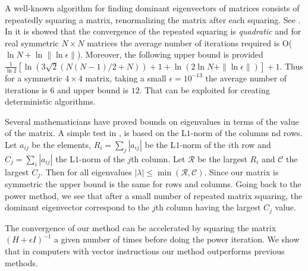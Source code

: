 \documentclass{birkjour}
\numberwithin{equation}{section}
\begin{document}
A well-known algorithm for finding dominant eigenvectors of matrices consists of repeatedly squaring a matrix, renormalizing the matrix after each squaring. See \cite{Wilkinson1988}. In \cite{Kostlan1991} it is showed that the convergence of the repeated squaring is \emph{quadratic} and for real symmetric $N \times N$ matrices the average number of iterations required is O($\ln N + \ln \|\ln \epsilon\|$). Moreover, the following upper bound is provided $\frac{1}{\ln 2} [ \ln( 3 \sqrt{2} ( N ( N - 1 ) / 2 + N ) ) + 1 + \ln( 2 \ln N + \|\ln \epsilon\|) ] + 1$. Thus for a symmetric $4 \times 4$ matrix, taking a small $\epsilon = 10^{-13}$ the average number of iterations is $6$ and upper bound is $12$. That can be exploited for creating deterministic algorithms.

Several mathematicians have proved bounds on eigenvalues in terms of the value of the matrix. A simple test in \cite{brauer1946}, is based on the L$1$-norm of the columns nd rows. Let $a_{ij}$ be the elements, $R_i = \sum_j |a_{ij}|$ be the L$1$-norm of the $i$th row and $C_j = \sum_i |a_{ij}|$ the L$1$-norm of the $j$th column. Let $\mathcal R$ be the largest $R_i$ and $\mathcal C$ the largest $C_j$. Then for all eigenvalues $|\lambda| \leq \min(\mathcal R, \mathcal C)$. Since our matrix is symmetric the upper bound is the same for rows and columns. Going back to the power method, we see that after a small number of repeated matrix squaring, the dominant eigenvector correspond to the $j$th column having the largest $C_j$ value.

The convergence of our method can be accelerated by squaring the matrix $(H + \epsilon I)^{-1}$ a given number of times before doing the power iteration. We show that in computers with vector instructions our method outperforms previous methods.



\end{document}
